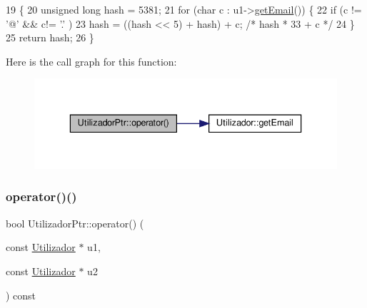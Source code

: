 \begin{DoxyCode}
19                                                 \{
20         \textcolor{keywordtype}{unsigned} \textcolor{keywordtype}{long} hash = 5381;
21         \textcolor{keywordflow}{for} (\textcolor{keywordtype}{char} c : u1->\hyperlink{classUtilizador_aea88bb297704762d0cccc909b8c2da54}{getEmail}()) \{
22             \textcolor{keywordflow}{if} (c != \textcolor{charliteral}{'@'} && c!= \textcolor{charliteral}{'.'} )
23                 hash = ((hash << 5) + hash) + c; \textcolor{comment}{/* hash * 33 + c */}
24         \}
25         \textcolor{keywordflow}{return} hash;
26     \}
\end{DoxyCode}
Here is the call graph for this function\+:
\nopagebreak
\begin{figure}[H]
\begin{center}
\leavevmode
\includegraphics[width=336pt]{structUtilizadorPtr_a51b14cea42ccf48388754bb5513f736f_cgraph}
\end{center}
\end{figure}
\mbox{\label{structUtilizadorPtr_afdc486a21619e0451d59dd4a9f244866}} 
\subsubsection{\texorpdfstring{operator()()}{operator()()}\hspace{0.1cm}{\footnotesize\ttfamily [2/2]}}
{\footnotesize\ttfamily bool Utilizador\+Ptr\+::operator() (\begin{DoxyParamCaption}\item[{const \hyperlink{classUtilizador}{Utilizador} $\ast$}]{u1,  }\item[{const \hyperlink{classUtilizador}{Utilizador} $\ast$}]{u2 }\end{DoxyParamCaption}) const\hspace{0.3cm}{\ttfamily [inline]}}


